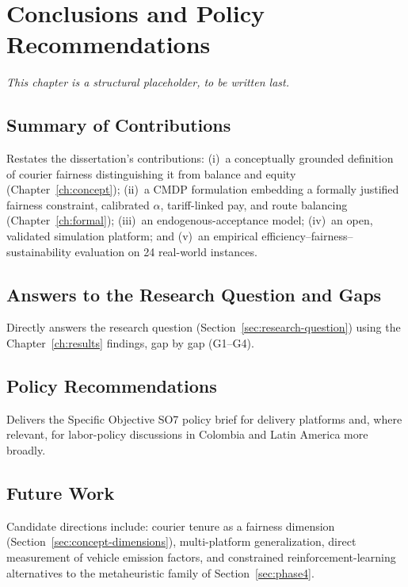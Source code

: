 \documentclass[12pt,a4paper]{report}
\begin{document}
\chapter{Conclusions and Policy Recommendations}
\label{ch:conclusions}

\begingroup\small\noindent\textit{This chapter is a structural placeholder, to be written last.}\endgroup

\section{Summary of Contributions}
Restates the dissertation's contributions: (i)~a conceptually grounded definition of courier fairness distinguishing it from balance and equity (Chapter~\ref{ch:concept}); (ii)~a CMDP formulation embedding a formally justified fairness constraint, calibrated $\alpha$, tariff-linked pay, and route balancing (Chapter~\ref{ch:formal}); (iii)~an endogenous-acceptance model; (iv)~an open, validated simulation platform; and (v)~an empirical efficiency--fairness--sustainability evaluation on 24 real-world instances.

\section{Answers to the Research Question and Gaps}
Directly answers the research question (Section~\ref{sec:research-question}) using the Chapter~\ref{ch:results} findings, gap by gap (G1--G4).

\section{Policy Recommendations}
Delivers the Specific Objective SO7 policy brief for delivery platforms and, where relevant, for labor-policy discussions in Colombia and Latin America more broadly.

\section{Future Work}
Candidate directions include: courier tenure as a fairness dimension (Section~\ref{sec:concept-dimensions}), multi-platform generalization, direct measurement of vehicle emission factors, and constrained reinforcement-learning alternatives to the metaheuristic family of Section~\ref{sec:phase4}.


\end{document}
